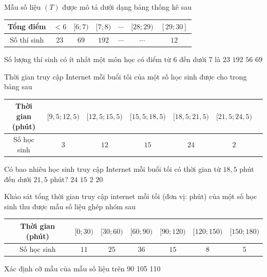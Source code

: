 \begin{ex}%
	Mẫu số liệu $(T)$ được mô  tả dưới dạng bảng thống kê sau
	\begin{center}
		\begin{tabular}{|c|c|c|c|c|c|c|}
			\hline 
			Tổng điểm & $< 6$ & $[6;7)$ & $[7;8)$ &  $\cdots$ & $[28;29)$ & $[29;30]$ \\
			\hline 
			Số thí sinh & $23$ & $69$ & $192$ & $\cdots$ & $\cdots$ & $12$ \\  \hline
		\end{tabular}
	\end{center}
	Số lượng thí sinh  có ít nhất một môn học có điểm từ $6$ đến dưới $7$ là
	 \choice
		 {$23$}
		{$192$} 
		{$56$} 
		{\True $69$} 
\end{ex}

\begin{ex}%
	Thời gian truy cập Internet mỗi buổi  tối của một số học sinh được cho trong bảng sau
	\begin{center}
		\begin{tabular}{|c|c|c|c|c|c|c|}
			 \hline
			Thời gian (phút) & $[9{,}5;12{,}5)$ & $[12{,}5;15{,}5)$ & $[15{,}5;18{,}5)$  & $[18{,}5;21{,}5)$ & $[21{,}5;24{,}5)$ \\
			 \hline
			 Số học sinh & $3$ & $12$ & $15$ & $24$ & $2$\\ \hline
		\end{tabular}
	\end{center}
	Có bao nhiêu học sinh truy cập Internet mỗi buổi tối có thời gian từ $18{,}5$ phút đến dưới $21{,}5$ phút? 
	\choice 
		{\True  $24$}
		 {$15$}
		 {$2$}
		 {$20$}
\end{ex}

\begin{ex}%
	Khảo sát  tổng thời gian truy cập internet mỗi tối (đơn vị: phút) của một số học sinh thu được mẫu số liệu ghép nhóm sau
	\begin{center}
		\begin{tabular}{|c|c|c|c|c|c|c|}
			 \hline
			Thời gian (phút) & $[0;30)$ & $[30;60)$ & $[60;90)$ & $[90;120)$ &  $[120;150)$ & $[150;180)$ \\
			\hline 
			Số học sinh & $11$  & $25$ & $36$ & $15$ & $8$ & $5$ \\
			 \hline
		\end{tabular}
	\end{center}
	Xác định cỡ mẫu của  mẫu số liệu trên
	 \choice
		{90} 
		{} 
		{105} 
		 {110}
\end{ex}

